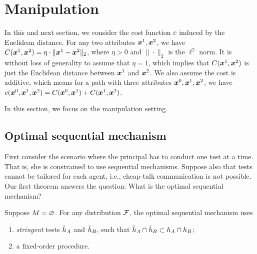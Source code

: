 \section{Manipulation}\label{sec: distance cost}

In this and next section, we consider the cost function $c$ induced by the Euclidean distance. For any two attributes $\boldsymbol{x}^1, \boldsymbol{x}^2$, we have $C(\boldsymbol{x}^1,\boldsymbol{x}^2) = \eta\cdot \|\boldsymbol{x}^1 - \boldsymbol{x}^2\|_2$, where $\eta>0$ and $\| \cdot \|_2$ is the $\ell^2$ norm. It is without loss of generality to assume that $\eta=1$, which implies that $C(\boldsymbol{x}^1,\boldsymbol{x}^2)$ is just the Euclidean distance between $\boldsymbol{x}^1$ and $\boldsymbol{x}^2$. We also assume the cost is additive, which means for a path with three attributes $\boldsymbol{x}^0, \boldsymbol{x}^1, \boldsymbol{x}^2$, we have 
$c(\boldsymbol{x}^0,\boldsymbol{x}^1,\boldsymbol{x}^2) = C(\boldsymbol{x}^0,\boldsymbol{x}^1)+C(\boldsymbol{x}^1,\boldsymbol{x}^2) $.


In this section, we focus on the manipulation setting.

\subsection{Optimal sequential mechanism}\label{subsec:seq manipulation}
First consider the scenario where the principal has to  conduct one test at a time.
That is, she is constrained to use sequential mechanisms.
Suppose also that tests cannot be tailored for each agent, i.e., cheap-talk communication is not possible.
Our first theorem answers the question: What is the optimal sequential mechanism? 

\begin{theorem}\label{thm: optimal max qualified}
Suppose $M=\varnothing$. 
   For any distribution $\mathcal{F}$, the optimal sequential mechanism uses
    \begin{enumerate}
        \item  \emph{stringent} tests $\tilde {h}_A$ and $\tilde {h}_B$, such that $\tilde{h}_A \cap \tilde {h}_B \subset h_A \cap h_B$;
        \item a fixed-order procedure.
    \end{enumerate}
\end{theorem}


